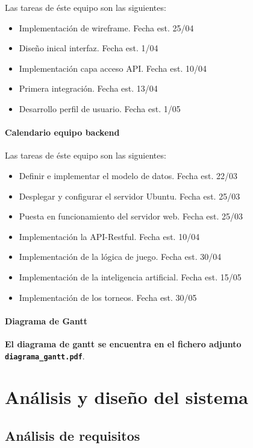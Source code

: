 \documentclass{article}
\begin{document}
Las tareas de éste equipo son las siguientes:
\begin{itemize}

    \item Implementación de wireframe. Fecha est. 25/04
    \item Diseño inical interfaz. Fecha est. 1/04
    \item Implementación capa acceso API. Fecha est. 10/04
    \item Primera integración. Fecha est. 13/04
    \item Desarrollo perfil de usuario. Fecha est. 1/05
\end{itemize}
\paragraph{Calendario equipo backend}


Las tareas de éste equipo son las siguientes:
\begin{itemize}
    \item Definir e implementar el modelo de datos. Fecha est. 22/03
    \item Desplegar y configurar el servidor Ubuntu. Fecha est. 25/03
    \item Puesta en funcionamiento del servidor web. Fecha est. 25/03
    \item Implementación la API-Restful. Fecha est. 10/04
    \item Implementación de la lógica de juego. Fecha est. 30/04
    \item Implementación de la inteligencia artificial. Fecha est. 15/05
    \item Implementación de los torneos. Fecha est. 30/05
\end{itemize}


\paragraph{Diagrama de Gantt}
\textbf{El diagrama de gantt se encuentra en el fichero adjunto \texttt{diagrama\_gantt.pdf}}.

\section{Análisis y diseño del sistema}
\subsection{Análisis de requisitos}
\end{document}

